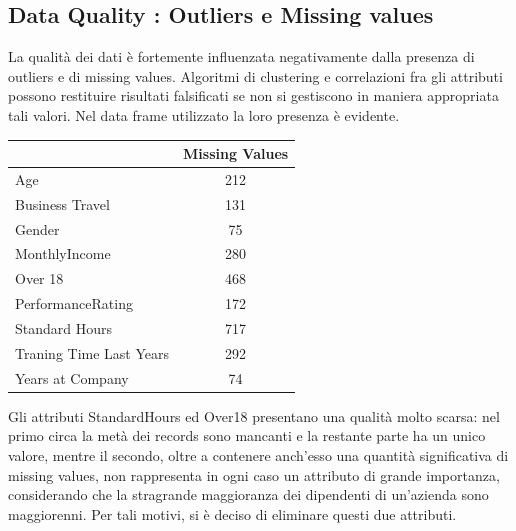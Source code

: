 \documentclass[a4paper,9pt]{article}
\begin{document}
\subsection{Data Quality : Outliers e Missing values}
La qualità dei dati è fortemente influenzata negativamente dalla presenza di outliers e di missing values. Algoritmi di clustering e correlazioni fra gli attributi possono restituire risultati falsificati se non si gestiscono in maniera appropriata tali valori. 
Nel data frame utilizzato la loro presenza è evidente.

\begin{center}
\begin{tabular}{lc}
\toprule
 &\bfseries Missing Values \\
\hline
\hline
\rowcolor[gray]{0.9}
Age & 212\\
Business Travel & 131\\
\rowcolor[gray]{0.9}
Gender & 75\\
MonthlyIncome & 280\\
\rowcolor[gray]{0.9}
Over 18 & 468\\
PerformanceRating & 172\\
\rowcolor[gray]{0.9}
Standard Hours & 717\\
Traning Time Last Years & 292\\
\rowcolor[gray]{0.9}
Years at Company & 74\\
\bottomrule
\end{tabular}
\end{center}

Gli attributi StandardHours ed Over18 presentano una qualità molto scarsa: nel primo circa la metà dei records sono mancanti e la restante parte ha un unico valore, mentre il secondo, oltre a contenere anch'esso una quantità significativa di missing values, non rappresenta in ogni caso un attributo di grande importanza, considerando che la stragrande maggioranza dei dipendenti di un'azienda sono maggiorenni. Per tali motivi, si è deciso di eliminare questi due attributi.
\end{document}
